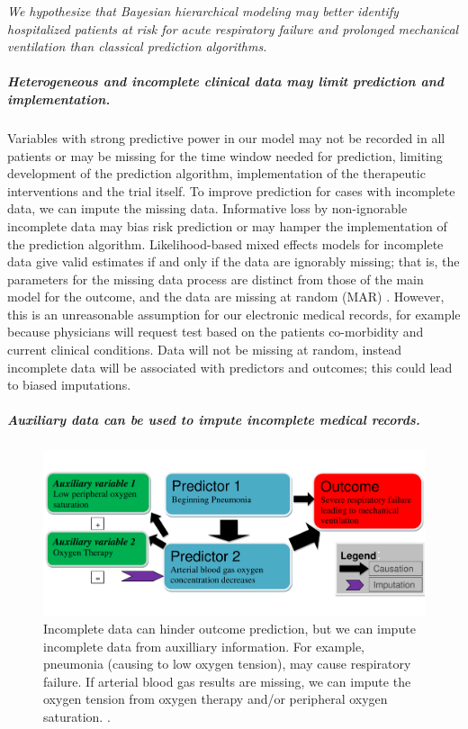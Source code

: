 \documentclass[11pt,notitlepage]{article}
\begin{document}
\emph{We hypothesize that Bayesian hierarchical modeling may better identify hospitalized patients at risk for acute respiratory failure and prolonged mechanical ventilation than classical prediction algorithms.}


\subparagraph*{Heterogeneous and incomplete clinical data may limit prediction and implementation.}
Variables with strong predictive power in our model may not be recorded in all patients or may be missing for the time window needed for prediction, limiting development of the prediction algorithm, implementation of the therapeutic interventions and the trial itself. To improve prediction for cases with incomplete data, we can impute the missing data. Informative loss by non-ignorable incomplete data may bias risk prediction or may hamper the implementation of the prediction algorithm. Likelihood-based mixed effects models for incomplete data give valid estimates if and only if the data are ignorably missing; that is, the parameters for the missing data process are distinct from those of the main model for the outcome, and the data are missing at random (MAR) \cite{Rubin_1976}. However, this is an unreasonable assumption for our electronic medical records, for example because physicians will request test based on the patients co-morbidity and current clinical conditions. Data will not be missing at random, instead incomplete data will be associated with predictors and outcomes; this could lead to biased imputations.

\subparagraph*{Auxiliary data can be used to impute incomplete medical records.}

\begin{figure} 
 \vspace{-30pt}
 \includegraphics[scale=0.4]{Figures/Bayesian_imputation.pdf}
    \vspace{-20pt}
  \caption{\footnotesize Incomplete data can hinder outcome prediction, but we can impute incomplete data from auxilliary information. For example, pneumonia (causing to low oxygen tension), may cause respiratory failure. If arterial blood gas results are missing, we can impute the oxygen tension from oxygen therapy and/or peripheral oxygen saturation. \cite{Hall_25389642}.}
   \vspace{-20pt}
    \label{fig:Imputation_fig}
\end{figure}
\end{document}
